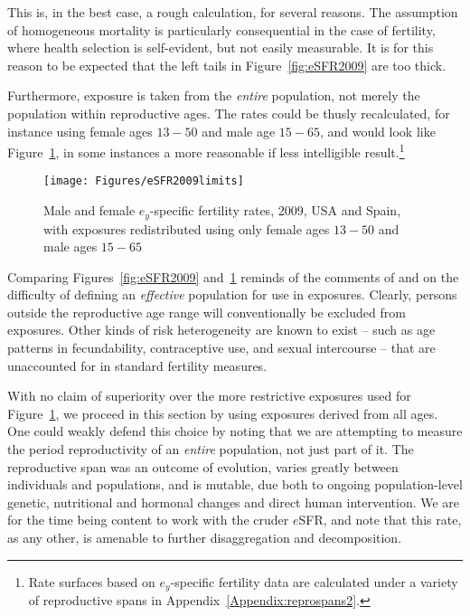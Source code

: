 This is, in the best case, a rough calculation, for several reasons. The
assumption of homogeneous mortality is particularly consequential in the case of 
fertility, where health selection is self-evident, but not easily measurable.
It is for this reason to be expected that the left tails in
Figure~\ref{fig:eSFR2009} are too thick. 

Furthermore, exposure is taken from the \textit{entire} population, not merely
the population within reproductive ages. The rates could be thusly recalculated,
for instance using female ages $13-50$ and male age $15-65$, and would look like 
Figure~\ref{fig:eSFR2009limits}, in some instances a more reasonable if less
intelligible result.\footnote{Rate surfaces based on $e_y$-specific fertility
data are calculated under a variety of reproductive spans in
Appendix~\ref{Appendix:reprospans2}.}

\begin{figure}[ht!]
        \centering  
          \caption{Male and female $e_y$-specific fertility rates, 2009, USA and
          Spain, with exposures redistributed using only female ages $13-50$ and
          male ages $15-65$}
          \texttt{[image: Figures/eSFR2009limits]}
          \label{fig:eSFR2009limits}
\end{figure}

Comparing Figures~\ref{fig:eSFR2009} and~\ref{fig:eSFR2009limits} reminds of the
comments of \citet{gupta1978alternative} and \citet{mitra1976effect} on the difficulty of
defining an \textit{effective} population for use in exposures. Clearly, persons
outside the reproductive age range will conventionally be excluded from
exposures. Other kinds of risk heterogeneity are known to exist -- such as age
patterns in fecundability, contraceptive use, and sexual intercourse -- that are
unaccounted for in standard fertility measures. 

With no claim of superiority over the more
restrictive exposures used for Figure~\ref{fig:eSFR2009limits}, we proceed
in this section by using exposures derived from all ages. One could weakly
defend this choice by noting that we are attempting to measure the period
reproductivity of an \textit{entire} population, not just part of it. The
reproductive span was an outcome of evolution, varies greatly between
individuals and populations, and is mutable, due both to ongoing
population-level genetic, nutritional and hormonal changes and direct human
intervention. We are for the time being content to work with the cruder
$e$SFR, and note that this rate, as any other, is amenable to further disaggregation and
decomposition.

